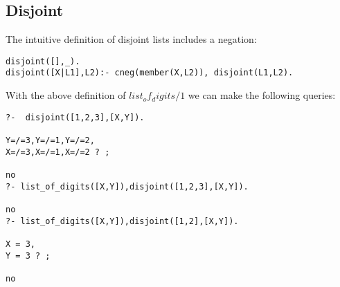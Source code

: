 \documentclass{tlp}
\begin{document}
\subsection*{Disjoint}

The intuitive definition of disjoint lists includes a negation:
\begin{small}
\begin{verbatim}
disjoint([],_).
disjoint([X|L1],L2):- cneg(member(X,L2)), disjoint(L1,L2).
\end{verbatim}
\end{small}

With the above definition of $list_of_digits/1$ we can make the following
queries: 
\begin{small}
\begin{verbatim}
?-  disjoint([1,2,3],[X,Y]).

Y=/=3,Y=/=1,Y=/=2,
X=/=3,X=/=1,X=/=2 ? ;

no
?- list_of_digits([X,Y]),disjoint([1,2,3],[X,Y]).

no
?- list_of_digits([X,Y]),disjoint([1,2],[X,Y]).

X = 3,
Y = 3 ? ;

no
\end{verbatim}
\end{small}
\end{document}
